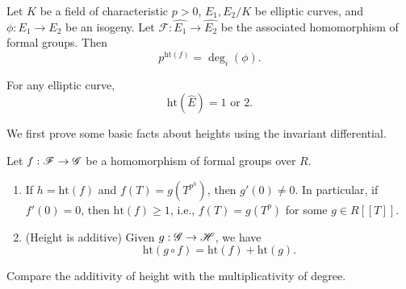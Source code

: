 \begin{thm}
Let $K$ be a field of characteristic $p>0$, $E_1,E_2/K$ be elliptic curves, and $\phi:E_1\to E_2$ be an isogeny. Let $\mathscr F:\hat{E_1}\to \hat{E_2}$ be the associated homomorphism of formal groups. Then
\[
p^{\text{ht}(f)}=\deg_i(\phi).
\]

For any elliptic curve,
\[
\text{ht}(\hat E)=1 \text{ or }2.
\]
\end{thm}
We first prove some basic facts about heights using the invariant differential. 
\begin{pr}
Let $f:\mathscr{F}\to \mathscr{G}$ be a homomorphism of formal groups over $R$.
\begin{enumerate}
\item
If $h=\text{ht}(f)$ and $f(T)=g(T^{p^h})$, then $g'(0)\ne0$. In particular, if $f'(0)=0$, then $\text{ht}(f)\ge 1$, i.e., $f(T)=g(T^p)$ for some $g\in R[[T]]$.
\item
(Height is additive) Given $g:\mathscr{G}\to \mathscr H$, we have
\[
\text{ht}(g\circ f)=\text{ht}(f)+\text{ht}(g).
\]
\end{enumerate}
\end{pr}
Compare the additivity of height with the multiplicativity of degree.
